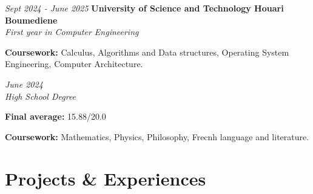 \documentclass[10pt, letterpaper]{article}
\begin{document}
\begin{twocolentry}{\textit{Sept 2024 - June 2025}}
    \textbf{University of Science and Technology Houari Boumediene} \\
    \textit{First year in Computer Engineering}
\end{twocolentry}
\begin{onecolentry}
    \begin{highlights}
    \item \textbf{Coursework:} Calculus, Algorithms and Data
        structures, Operating System Engineering, Computer Architecture.
    \end{highlights}
\end{onecolentry}

\vspace{0.05cm}

\begin{twocolentry}{\textit{June 2024}}
     \\
    \textit{High School Degree}
\end{twocolentry}
\begin{onecolentry}
    \begin{highlights}
    \item \textbf{Final average:} 15.88/20.0
    \item \textbf{Coursework:} Mathematics, Physics, Philosophy, Frecnh language and literature.
    \end{highlights}
\end{onecolentry}

\vspace{0.15cm}


\section{Projects \& Experiences}
\end{document}
